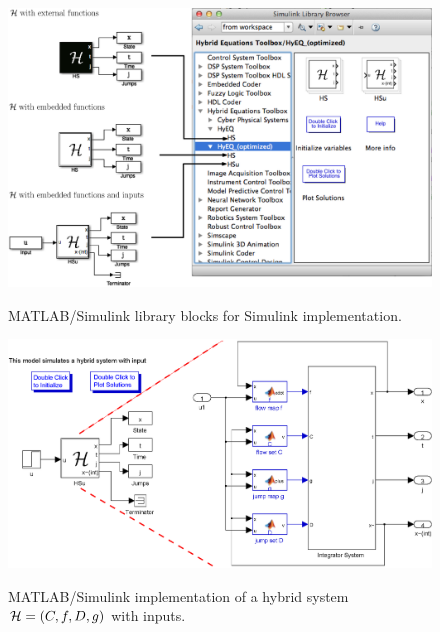 \documentclass{article}
\begin{document}
\begin{figure}[ht]
  \begin{center}
    {\includegraphics[width=1\textwidth]{figures/Simulink/SimulinkimplementationMac.eps}}
\caption{MATLAB/Simulink library blocks for Simulink implementation.}
\label{fig:Simulinklibblocks}
  \end{center}
\end{figure}

\begin{figure}[ht]
  \begin{center}
    {\includegraphics[width=.75\textwidth]{figures/Simulink/HSinput.eps}}
\caption{MATLAB/Simulink implementation of a hybrid system $\mathcal{H} =(C,f,D,g)$ with inputs.}
\label{fig:HSinput}
  \end{center}
\end{figure}
\end{document}
